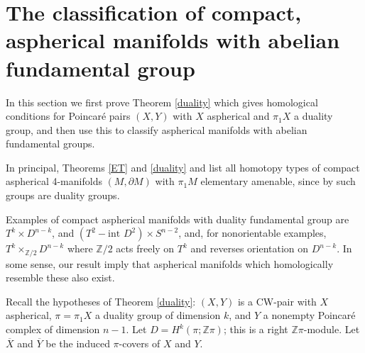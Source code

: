 \documentclass[12pt]{amsart}
\theoremstyle{definition}
\newcommand{\Z}{\mathbb Z}
\newcommand{\ol}[1]{{\overline{#1}}}
\begin{document}
\section{The classification of compact, aspherical manifolds with abelian fundamental group} \label{examples}

In this section we first prove Theorem \ref{duality} which gives homological conditions for Poincar\'e pairs $(X,Y)$ with $X$ aspherical and $\pi_1X$ a duality group, and then use this to classify aspherical manifolds with abelian fundamental groups.  

In principal, Theorems \ref{ET}  and  \ref{duality} and \cite{DH2} list all homotopy types of compact aspherical 4-manifolds $(M,\partial M)$ with $\pi_1M$ elementary amenable, since by \cite{DH2} such groups are duality groups.


Examples of compact aspherical manifolds with duality fundamental group are    $T^k \times D^{n-k}$, and $(T^2 - \text{int } D^2) \times S^{n-2}$, and, for nonorientable examples, $T^k \times_{\Z/2} D^{n-k}$ where $\Z/2$ acts freely on $T^k$ and reverses orientation on $D^{n-k}$.  In some sense, our result imply that aspherical manifolds which homologically resemble these also exist.


Recall the hypotheses of Theorem \ref{duality}: $(X,Y)$ is a CW-pair with $X$ aspherical, $\pi = \pi_1X$ a duality group of dimension $k$, and $Y$ a nonempty Poincar\'e complex of dimension $n-1$.   Let $D = H^k(\pi;\Z\pi)$; this is a right $\Z\pi$-module.  Let $\ol X$ and $\ol Y$ be the induced $\pi$-covers of $X$ and $Y$.
\end{document}
